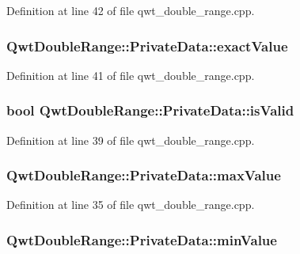 Definition at line 42 of file qwt\-\_\-double\-\_\-range.\-cpp.

\hypertarget{class_qwt_double_range_1_1_private_data_af46e947141f6a3102de4f30a2176f2a8}{
\subsubsection[{exact\-Value}]{ Qwt\-Double\-Range\-::\-Private\-Data\-::exact\-Value}}\label{class_qwt_double_range_1_1_private_data_af46e947141f6a3102de4f30a2176f2a8}


Definition at line 41 of file qwt\-\_\-double\-\_\-range.\-cpp.

\hypertarget{class_qwt_double_range_1_1_private_data_a2370b2bf4cc4153c6f77380cc3becd4b}{
\subsubsection[{is\-Valid}]{\setlength{\rightskip}{0pt plus 5cm}bool Qwt\-Double\-Range\-::\-Private\-Data\-::is\-Valid}}\label{class_qwt_double_range_1_1_private_data_a2370b2bf4cc4153c6f77380cc3becd4b}


Definition at line 39 of file qwt\-\_\-double\-\_\-range.\-cpp.

\hypertarget{class_qwt_double_range_1_1_private_data_a4a36aef416ac0a7f1710975cb00ffa6e}{
\subsubsection[{max\-Value}]{ Qwt\-Double\-Range\-::\-Private\-Data\-::max\-Value}}\label{class_qwt_double_range_1_1_private_data_a4a36aef416ac0a7f1710975cb00ffa6e}


Definition at line 35 of file qwt\-\_\-double\-\_\-range.\-cpp.

\hypertarget{class_qwt_double_range_1_1_private_data_a999e1c8d20be41fc643fe35476c1462d}{
\subsubsection[{min\-Value}]{ Qwt\-Double\-Range\-::\-Private\-Data\-::min\-Value}}\label{class_qwt_double_range_1_1_private_data_a999e1c8d20be41fc643fe35476c1462d}


